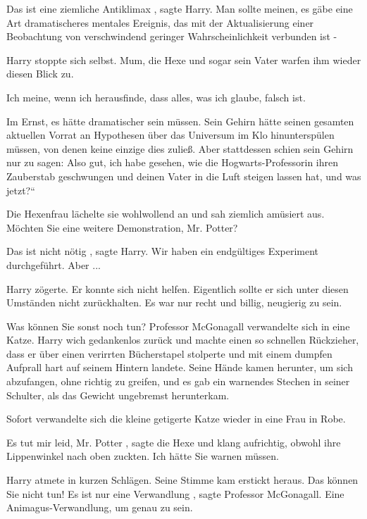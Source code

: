 \glqq Das ist eine ziemliche Antiklimax\grqq{} , sagte Harry. \glqq Man sollte meinen,
es gäbe eine Art dramatischeres mentales Ereignis, das mit der Aktualisierung
einer Beobachtung von verschwindend geringer Wahrscheinlichkeit verbunden ist
-\grqq{}

Harry stoppte sich selbst. Mum, die Hexe und sogar sein Vater warfen ihm wieder
diesen Blick zu.

\glqq Ich meine, wenn ich herausfinde, dass alles, was ich glaube, falsch
ist.\grqq{}

Im Ernst, es hätte dramatischer sein müssen. Sein Gehirn hätte seinen gesamten
aktuellen Vorrat an Hypothesen über das Universum im Klo hinunterspülen müssen,
von denen keine einzige dies zuließ. Aber stattdessen schien sein Gehirn nur zu
sagen: \glqq Also gut, ich habe gesehen, wie die Hogwarts-Professorin ihren
Zauberstab geschwungen und deinen Vater in die Luft steigen lassen hat, und was
jetzt?“

Die Hexenfrau lächelte sie wohlwollend an und sah ziemlich amüsiert aus. \glqq
Möchten Sie eine weitere Demonstration, Mr. Potter?\grqq{}

\glqq Das ist nicht nötig\grqq{} , sagte Harry. \glqq Wir haben ein endgültiges
Experiment durchgeführt. Aber ...\grqq{}

Harry zögerte. Er konnte sich nicht helfen. Eigentlich sollte er sich unter
diesen Umständen nicht zurückhalten. Es war nur recht und billig, neugierig zu
sein.

\glqq Was können Sie sonst noch tun?\grqq{} Professor McGonagall verwandelte
sich in eine Katze. Harry wich gedankenlos zurück und machte einen so schnellen
Rückzieher, dass er über einen verirrten Bücherstapel stolperte und mit einem
dumpfen Aufprall hart auf seinem Hintern landete. Seine Hände kamen herunter, um
sich abzufangen, ohne richtig zu greifen, und es gab ein warnendes Stechen in
seiner Schulter, als das Gewicht ungebremst herunterkam.

Sofort verwandelte sich die kleine getigerte Katze wieder in eine Frau in Robe.

\glqq Es tut mir leid, Mr. Potter\grqq{} , sagte die Hexe und klang aufrichtig, obwohl
ihre Lippenwinkel nach oben zuckten. \glqq Ich hätte Sie warnen müssen.\grqq{}

Harry atmete in kurzen Schlägen. Seine Stimme kam erstickt heraus. \glqq Das
können Sie nicht tun!\grqq{} \glqq Es ist nur eine Verwandlung\grqq{} , sagte Professor
McGonagall. \glqq Eine Animagus-Verwandlung, um genau zu sein.\grqq{}

